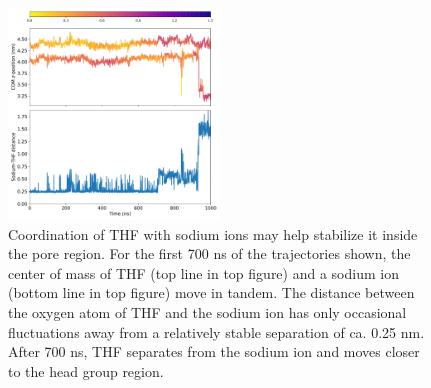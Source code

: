 \documentclass{article}
\begin{document}
  \begin{figure}
  \centering
  \includegraphics[width=0.5\textwidth]{thf_sodium_coordination.pdf}
  \caption{Coordination of THF with sodium ions may help stabilize it inside the
  pore region. For the first 700 ns of the trajectories shown, the center of mass
  of THF (top line in top figure) and a sodium ion (bottom line in top figure) move
  in tandem. The distance between the oxygen atom of THF and the sodium ion has only
  occasional fluctuations away from a relatively stable separation of ca. 0.25 nm. 
  After 700 ns, THF separates from the sodium ion and moves closer to the head group
  region.}\label{fig:thf_sodium_coordination}
  \end{figure}
  
  
%  
  
\end{document}
